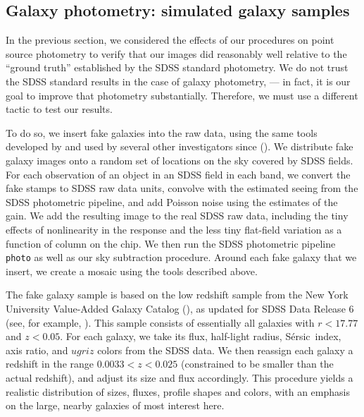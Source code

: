 \documentclass[10pt,preprint]{aastex}
\newcommand{\Sersic}{S\'ersic}
\begin{document}
\subsection{Galaxy photometry: simulated galaxy samples}
\label{sec:fakegal}

In the previous section, we considered the effects of our procedures
on point source photometry to verify that our images did reasonably
well relative to the ``ground truth'' established by the SDSS standard
photometry.  We do not trust the SDSS standard results in the case of
galaxy photometry, --- in fact, it is our goal to improve that
photometry substantially.  Therefore, we must use a different tactic
to test our results.

To do so, we insert fake galaxies into the raw data, using the same
tools developed by \citet{blanton05b} and used by several other
investigators since (\citealt{blanton04b, mandelbaum06a, masjedi06a}).
We distribute fake galaxy images onto a random set of locations on the
sky covered by SDSS fields. For each observation of an object in an
SDSS field in each band, we convert the fake stamps to SDSS raw data
units, convolve with the estimated seeing from the SDSS photometric
pipeline, and add Poisson noise using the estimates of the gain. We
add the resulting image to the real SDSS raw data, including the tiny
effects of nonlinearity in the response and the less tiny flat-field
variation as a function of column on the chip. We then run the SDSS
photometric pipeline {\tt photo} as well as our sky subtraction
procedure.  Around each fake galaxy that we insert, we create a mosaic
using the tools described above.

The fake galaxy sample is based on the low redshift sample from the
New York University Value-Added Galaxy Catalog (\citealt{blanton05a}),
as updated for SDSS Data Release 6 (see, for example,
\citealt{zhu10a}). This sample consists of essentially all galaxies
with $r<17.77$ and $z<0.05$.  For each galaxy, we take its flux,
half-light radius, \Sersic\ index, axis ratio, and $ugriz$ colors from
the SDSS data. We then reassign each galaxy a redshift in the range
$0.0033<z<0.025$ (constrained to be smaller than the actual redshift),
and adjust its size and flux accordingly.  This procedure yields a
realistic distribution of sizes, fluxes, profile shapes and colors,
with an emphasis on the large, nearby galaxies of most interest here.
\end{document}
